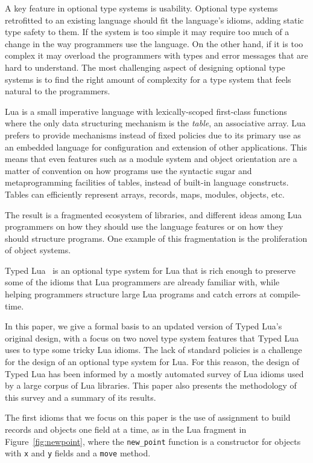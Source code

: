 \documentclass[preprint]{sigplanconf}
\begin{document}
A key feature in optional type systems is usability.
Optional type systems retrofitted to an existing
language should fit the language's idioms, adding
static type safety to them. If the system is too
simple it may require too much of a change in the way
programmers use the language. On the other hand,
if it is too complex it may overload the programmers
with types and error messages that are hard to
understand. The most challenging aspect of designing optional type systems is to find the right amount of complexity for a type system that feels natural to the programmers.

Lua is a small imperative language with lexically-scoped first-class functions where the only data structuring
mechanism is the \emph{table}, an associative array. Lua prefers to provide mechanisms instead of fixed policies due
to its primary use as an embedded language for configuration and
extension of other applications.
This means that even features such as a module system and
object orientation are a matter of convention on how
programs use the syntactic sugar and metaprogramming
facilities of tables, instead of
built-in language constructs. Tables can efficiently represent arrays, records, maps, modules,
objects, etc. 

The result is a fragmented ecosystem of libraries, and different
ideas among Lua programmers on how they should use the language
features or on how they should structure programs. One example
of this fragmentation is the proliferation of object systems.

Typed Lua~\cite{maidl2014tl,maidl2015tl} is an optional type system for
Lua that is rich enough to preserve some of the idioms
that Lua programmers are already familiar with, while
helping programmers structure large Lua programs and
catch errors at compile-time. 

In this paper, we give a formal basis to an updated version of Typed Lua's original design, with a focus on two novel type system
features that Typed Lua uses to type some tricky Lua idioms.
The lack of standard policies is a challenge for the design of
an optional type system for Lua. For this reason, the design
of Typed Lua has been informed by a mostly automated survey
of Lua idioms used by a large corpus of Lua libraries.
This paper also presents the methodology of this survey and
a summary of its results.

The first idioms that we focus on this paper is the use of assignment to build records and objects one field at a time, as in
the Lua fragment in Figure~\ref{fig:newpoint}, where the {\tt new\_point} function
is a constructor for objects with {\tt x} and {\tt y}
fields and a {\tt move} method.
\end{document}
